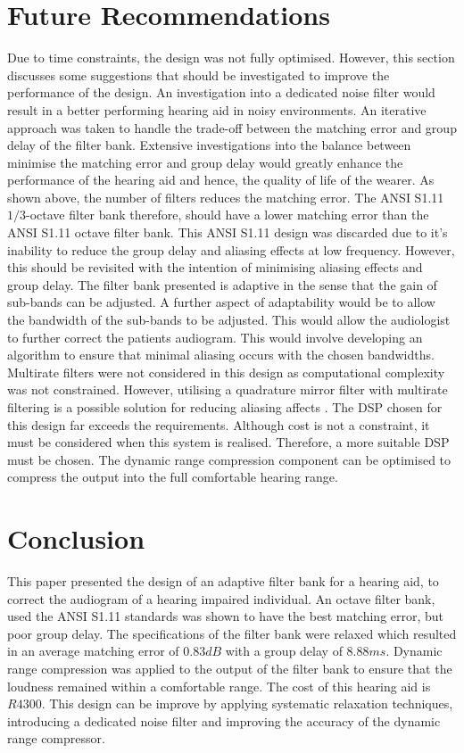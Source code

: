 \documentclass[11pt,onecolumn]{witseiepaper}
\begin{document}
\section{Future Recommendations}

\noindent Due to time constraints, the design was not fully optimised. However, this section discusses some suggestions that should be investigated to improve the performance of the design. An investigation into a dedicated noise filter would result in a better performing hearing aid in noisy environments. An iterative approach was taken to handle the trade-off between the matching error and group delay of the filter bank. Extensive investigations into the balance between minimise the matching error and group delay would greatly enhance the performance of the hearing aid and hence, the quality of life of the wearer. As shown above, the number of filters reduces the matching error. The ANSI S1.11 $1/3$-octave filter bank therefore, should have a lower matching error than the ANSI S1.11 octave filter bank. This ANSI S1.11 design was discarded due to it's inability to reduce the group delay and aliasing effects at low frequency. However, this should be revisited with the intention of minimising aliasing effects and group delay. The filter bank presented is adaptive in the sense that the gain of sub-bands can be adjusted. A further aspect of adaptability would be to allow the bandwidth of the sub-bands to be adjusted. This would allow the audiologist to further correct the patients audiogram. This would involve developing an algorithm to ensure that minimal aliasing occurs with the chosen bandwidths. Multirate filters were not considered in this design as computational complexity was not constrained. However, utilising a quadrature mirror filter with multirate filtering is a possible solution for reducing aliasing affects \cite{qmf}. The DSP chosen for this design far exceeds the requirements. Although cost is not a constraint, it must be considered when this system is realised. Therefore, a more suitable DSP must be chosen. The dynamic range compression component can be optimised to compress the output into the full comfortable hearing range. 

\section{Conclusion}

\noindent This paper presented the design of an adaptive filter bank for a hearing aid, to correct the audiogram of a hearing impaired individual. An octave filter bank, used the ANSI S1.11 standards was shown to have the best matching error, but poor group delay. The specifications of the filter bank were relaxed which resulted in an average matching error of $0.83dB$ with a group delay of $8.88ms$. Dynamic range compression was applied to the output of the filter bank to ensure that the loudness remained within a comfortable range. The cost of this hearing aid is $R4300$. This design can be improve by applying systematic relaxation techniques, introducing a dedicated noise filter and improving the accuracy of the dynamic range compressor.
\end{document}
